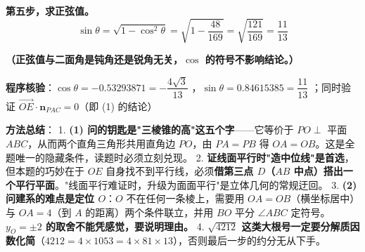 \begin{answer}
\textbf{第五步，求正弦值。}
\nopagebreak[4]
\[\sin\theta=\sqrt{1-\cos^{2}\theta}=\sqrt{1-\frac{48}{169}}=\sqrt{\frac{121}{169}}=\frac{11}{13}\]

\textbf{（正弦值与二面角是钝角还是锐角无关，$\cos$ 的符号不影响结论。）}

\textbf{程序核验}：$\cos\theta=-0.53293871=-\dfrac{4\sqrt3}{13}$ ，$\sin\theta=0.84615385=\dfrac{11}{13}$ ；同时验证 $\overrightarrow{OE}\cdot\boldsymbol n_{PAC}=0$（即 (1) 的结论）

\begin{gktip}
\textbf{方法总结}：
1. \textbf{(1) 问的钥匙是"三棱锥的高"这五个字}——它等价于 $PO\perp$ 平面 $ABC$，从而两个直角三角形共用直角边 $PO$，由 $PA=PB$ 得 $OA=OB$。这是全题唯一的隐藏条件，读题时必须立刻兑现。
2. \textbf{证线面平行时"造中位线"是首选}，但本题的巧妙在于 $OE$ 自身找不到平行线，必须\textbf{借第三点 $D$（$AB$ 中点）搭出一个平行平面}。"线面平行难证时，升级为面面平行"是立体几何的常规迂回。
3. \textbf{(2) 问建系的难点是定位 $O$}：$O$ 不在任何一条棱上，需要用 $OA=OB$（横坐标居中）与 $OA=4$（到 $A$ 的距离）两个条件联立，并用 $BO$ 平分 $\angle ABC$ 定符号。\textbf{$y_O=\pm2$ 的取舍不能凭感觉，要说明理由。}
4. \textbf{$\sqrt{4212}$ 这类大根号一定要分解质因数化简}（$4212=4\times1053=4\times81\times13$），否则最后一步的约分无从下手。
\end{gktip}



\par\medskip

\end{answer}

